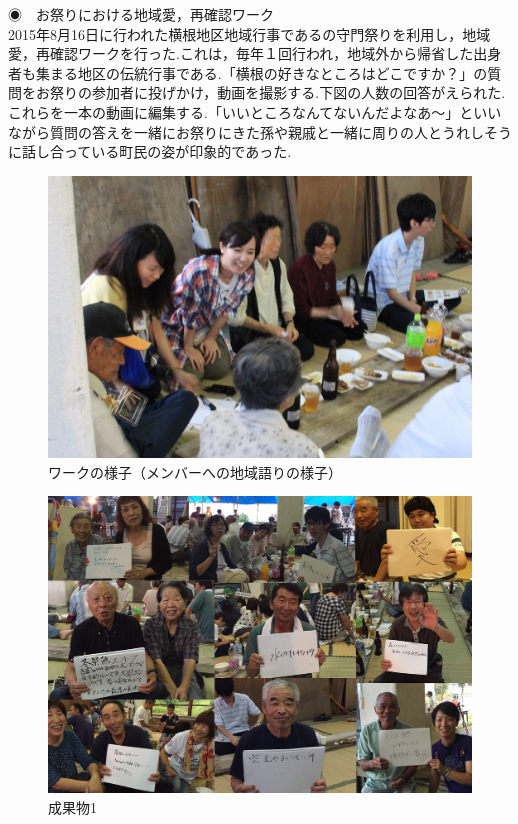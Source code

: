 \documentclass[a4paper]{jsarticle}
\begin{document}
\begin{itemize}


\subsubsubsection ◉　お祭りにおける地域愛，再確認ワーク\\
2015年8月16日に行われた横根地区地域行事であるの守門祭りを利用し，地域愛，再確認ワークを行った.これは，毎年１回行われ，地域外から帰省した出身者も集まる地区の伝統行事である.「横根の好きなところはどこですか？」の質問をお祭りの参加者に投げかけ，動画を撮影する.下図の人数の回答がえられた.これらを一本の動画に編集する.「いいところなんてないんだよなあ〜」といいながら質問の答えを一緒にお祭りにきた孫や親戚と一緒に周りの人とうれしそうに話し合っている町民の姿が印象的であった.

\begin{figure}[H]
  \begin{center}
    \includegraphics[width=0.8\hsize]{./images/IMG_4784.JPG}
    \caption{ワークの様子（メンバーへの地域語りの様子）}
    \label{fig:tmu_hino}
  \end{center}
\end{figure}
\begin{figure}[H]
  \begin{center}
    \includegraphics[width=0.8\hsize]{./images/yokone.png}
    \caption{成果物1}
    \label{fig:tmu_hino}
  \end{center}
\end{figure}



\end{itemize}
\end{document}

